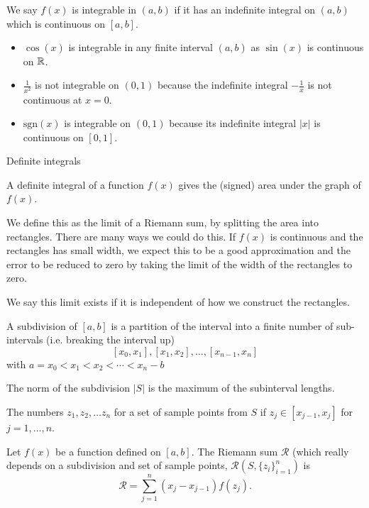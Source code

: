 \documentclass[10pt, a4paper]{article}
\begin{document}
\begin{definition}
    We say $f(x)$ is integrable in $(a, b)$ if it has an indefinite integral on $(a, b)$ which is continuous on $[a, b]$.
\end{definition}

\begin{example}\phantom{}
    \begin{itemize}
        \item $\cos(x)$ is integrable in any finite interval $(a, b)$ as $\sin(x)$ is continuous on $\mathbb{R}$.
        \item $\frac{1}{x ^ 2}$ is not integrable on $(0, 1)$ because the indefinite integral $-\frac{1}{x}$ is not continuous at $x = 0$.
        \item $\mathrm{sgn}(x)$ is integrable on $(0, 1)$ because its indefinite integral $|x|$ is continuous on $[0, 1]$.
    \end{itemize}
\end{example}

Definite integrals

A definite integral of a function $f(x)$ gives the (signed) area under the graph of $f(x)$.

We define this as the limit of a Riemann sum,
by splitting the area into rectangles.
There are many ways we could do this.
If $f(x)$ is continuous and the rectangles has small width,
we expect this to be a good approximation and the error to be reduced to zero by taking the limit of the width of the rectangles to zero.

We say this limit exists if it is independent of how we construct the rectangles.

\begin{definition}
    A subdivision of $[a, b]$ is a partition of the interval into a finite number of sub-intervals (i.e. breaking the interval up)
    \[
    [x_0, x_1], [x_1, x_2], \dotsc, [x_{n - 1}, x_n]
    \]
    with $a = x_0 < x_1 < x_2 < \dotsi < x_n - b$
\end{definition}
The norm of the subdivision $|S|$ is the maximum of the subinterval lengths.

The numbers $z_1, z_2, \dotsc z_n$ for a set of sample points from $S$ if $z_j \in [x_{j - 1}, x_j]$
for $j = 1, \dotsc, n$.
\begin{definition}
    Let $f(x)$ be a function defined on $[a, b]$.
    The Riemann sum $\mathcal{R}$ (which really depends on a subdivision and set of sample points,
    $\mathcal{R}(S, \{z_i\}_{i = 1}^{n})$ is
    \[
    \mathcal{R} = \sum_{j = 1}^{n}(x_j - x_{j - 1})f(z_j).
    \]
\end{definition}
\end{document}
